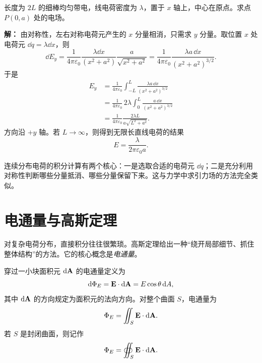 \begin{example}[有限长均匀带电直线在中垂线上一点的电场]
长度为 $2L$ 的细棒均匀带电，线电荷密度为 $\lambda$，置于 $x$ 轴上，中心在原点。求点 $P(0,a)$ 处的电场。

\textbf{解：} 由对称性，左右对称电荷元产生的 $x$ 分量相消，只需求 $y$ 分量。取位置 $x$ 处电荷元 $\dd q=\lambda\dd x$，则
\begin{equation}
\dd E_y = \frac{1}{4\pi\varepsilon_0}\frac{\lambda\dd x}{(x^2+a^2)}\frac{a}{\sqrt{x^2+a^2}}
= \frac{1}{4\pi\varepsilon_0}\frac{\lambda a\,\dd x}{(x^2+a^2)^{3/2}}.
\end{equation}
于是
\begin{align}
E_y &= \frac{1}{4\pi\varepsilon_0}\int_{-L}^{L}\frac{\lambda a\,\dd x}{(x^2+a^2)^{3/2}} \\
&= \frac{1}{4\pi\varepsilon_0}\,2\lambda\int_0^L \frac{a\,\dd x}{(x^2+a^2)^{3/2}} \\
&= \frac{1}{4\pi\varepsilon_0}\frac{2\lambda L}{a\sqrt{L^2+a^2}}.
\end{align}
方向沿 $+y$ 轴。若 $L\to \infty$，则得到无限长直线电荷的结果
\begin{equation}
E = \frac{\lambda}{2\pi\varepsilon_0 a}.
\end{equation}
\end{example}

\begin{remark}
连续分布电荷的积分计算有两个核心：一是选取合适的电荷元 $\dd q$；二是充分利用对称性判断哪些分量抵消、哪些分量保留下来。这与力学中求引力场的方法完全类似。
\end{remark}

\section{电通量与高斯定理}

对复杂电荷分布，直接积分往往很繁琐。高斯定理给出一种“绕开局部细节、抓住整体结构”的方法。它的核心概念是\emph{电通量}。

\begin{definition}[电通量]
穿过一小块面积元 $\dd \vb{A}$ 的电通量定义为
\begin{equation}
\dd \Phi_E = \vb{E}\cdot \dd \vb{A} = E\cos\theta\,\dd A,
\end{equation}
其中 $\dd\vb{A}$ 的方向规定为面积元的法向方向。对整个曲面 $S$，电通量为
\begin{equation}
\Phi_E = \iint_S \vb{E}\cdot \dd \vb{A}.
\end{equation}
若 $S$ 是封闭曲面，则记作
\begin{equation}
\Phi_E = \oiint_S \vb{E}\cdot \dd \vb{A}.
\end{equation}
\end{definition}

